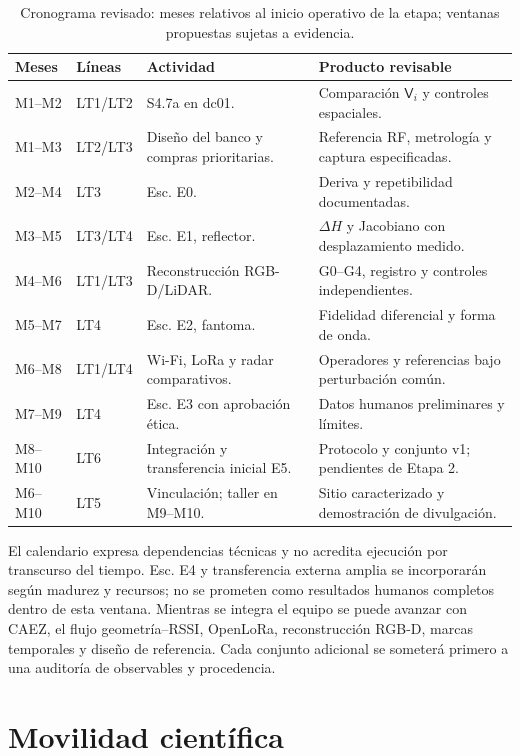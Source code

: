 \begin{table}[htbp]
\centering\small
\caption{Cronograma revisado: meses relativos al inicio operativo de la etapa; ventanas propuestas sujetas a evidencia.}
\label{tab:cronograma_etapa1}
\begin{tabularx}{\textwidth}{P{1.8cm}P{2.2cm}L L}
\toprule
Meses & Líneas & Actividad & Producto revisable\\
\midrule
M1--M2 & LT1/LT2 & S4.7a en dc01. & Comparación $\mathsf V_i$ y controles espaciales.\\
M1--M3 & LT2/LT3 & Diseño del banco y compras prioritarias. & Referencia RF, metrología y captura especificadas.\\
M2--M4 & LT3 & Esc. E0. & Deriva y repetibilidad documentadas.\\
M3--M5 & LT3/LT4 & Esc. E1, reflector. & $\Delta H$ y Jacobiano con desplazamiento medido.\\
M4--M6 & LT1/LT3 & Reconstrucción RGB-D/LiDAR. & G0--G4, registro y controles independientes.\\
M5--M7 & LT4 & Esc. E2, fantoma. & Fidelidad diferencial y forma de onda.\\
M6--M8 & LT1/LT4 & Wi-Fi, LoRa y radar comparativos. & Operadores y referencias bajo perturbación común.\\
M7--M9 & LT4 & Esc. E3 con aprobación ética. & Datos humanos preliminares y límites.\\
M8--M10 & LT6 & Integración y transferencia inicial E5. & Protocolo y conjunto v1; pendientes de Etapa 2.\\
M6--M10 & LT5 & Vinculación; taller en M9--M10. & Sitio caracterizado y demostración de divulgación.\\
\bottomrule
\end{tabularx}
\end{table}

El calendario expresa dependencias técnicas y no acredita ejecución por transcurso
del tiempo. Esc. E4 y transferencia externa amplia se incorporarán según madurez y
recursos; no se prometen como resultados humanos completos dentro de esta ventana.
Mientras se integra el equipo se puede avanzar con CAEZ, el flujo geometría--RSSI,
OpenLoRa, reconstrucción RGB-D, marcas temporales y diseño de referencia. Cada conjunto
adicional se someterá primero a una auditoría de observables y procedencia.

\section{Movilidad científica}

